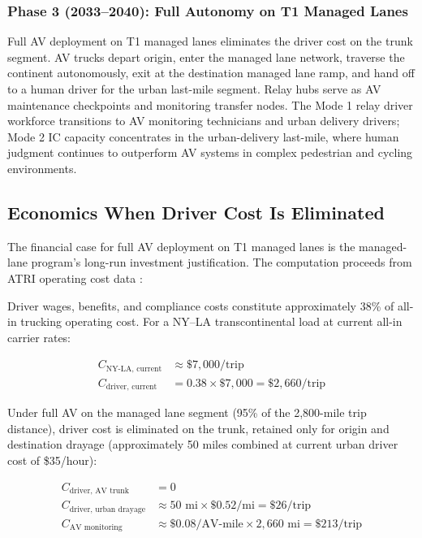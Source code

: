 \subsubsection*{Phase 3 (2033--2040): Full Autonomy on T1 Managed Lanes}

Full AV deployment on T1 managed lanes eliminates the driver cost on the trunk segment.
AV trucks depart origin, enter the managed lane network, traverse the continent autonomously,
exit at the destination managed lane ramp, and hand off to a human driver for the urban
last-mile segment. Relay hubs serve as AV maintenance checkpoints and monitoring transfer
nodes. The Mode 1 relay driver workforce transitions to AV monitoring technicians and urban
delivery drivers; Mode 2 IC capacity concentrates in the urban-delivery last-mile, where human
judgment continues to outperform AV systems in complex pedestrian and cycling environments.

\subsection{Economics When Driver Cost Is Eliminated}

The financial case for full AV deployment on T1 managed lanes is the managed-lane program's
long-run investment justification. The computation proceeds from ATRI operating cost data
\citep{ATRI_shortage2024}:

Driver wages, benefits, and compliance costs constitute approximately 38\% of all-in trucking
operating cost. For a NY--LA transcontinental load at current all-in carrier rates:

\begin{align*}
C_{\text{NY-LA, current}} &\approx \$7{,}000/\text{trip} \\
C_{\text{driver, current}} &= 0.38 \times \$7{,}000 = \$2{,}660/\text{trip}
\end{align*}

Under full AV on the managed lane segment (95\% of the 2,800-mile trip distance), driver cost
is eliminated on the trunk, retained only for origin and destination drayage
(approximately 50 miles combined at current urban driver cost of \$35/hour):

\begin{align*}
C_{\text{driver, AV trunk}} &= 0 \\
C_{\text{driver, urban drayage}} &\approx 50\text{ mi} \times \$0.52/\text{mi} = \$26/\text{trip} \\
C_{\text{AV monitoring}} &\approx \$0.08/\text{AV-mile} \times 2{,}660\text{ mi} = \$213/\text{trip}
\end{align*}

